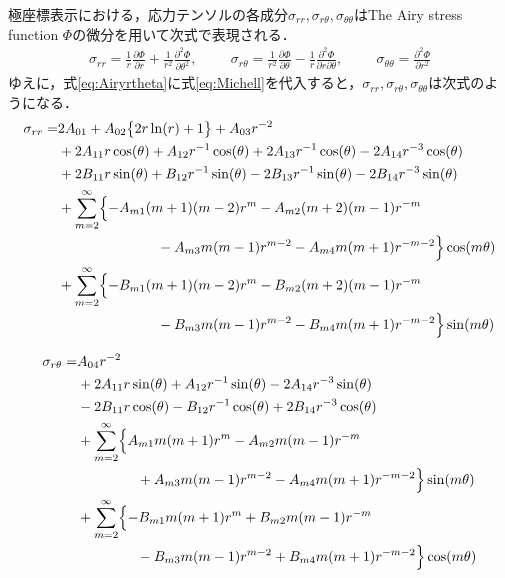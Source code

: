 極座標表示における，応力テンソルの各成分$\sigma_{rr},\sigma_{r\theta},\sigma_{\theta\theta}$はThe Airy stress function $\Phi$の微分を用いて次式で表現される．
\begin{align}
	\sigma_{rr}=\frac{1}{r}\frac{\partial \Phi}{\partial r}
	+\frac{1}{r^2}\frac{\partial^2 \Phi}{\partial \theta^2},\hspace{1cm}
	\sigma_{r\theta}=\frac{1}{r^2}\frac{\partial \Phi}{\partial \theta}
	-\frac{1}{r}\frac{\partial^2 \Phi}{\partial r\partial \theta},\hspace{1cm}
	\sigma_{\theta\theta}=\frac{\partial^2 \Phi}{\partial r^2}
	\label{eq:Airyrtheta}
\end{align}
ゆえに，式\eqref{eq:Airyrtheta}に式\eqref{eq:Michell}を代入すると，$\sigma_{rr},\sigma_{r\theta},\sigma_{\theta\theta}$は次式のようになる．
\begin{align}
	\sigma_{rr} =&2A_{01}
	+A_{02}\bigl\{ 2r\ln(r)+1\bigr\}
	+A_{03}r^{-2}
	\nonumber
	\\
	&+2A_{11}r\cos(\theta)
	+A_{12}r^{-1}\cos(\theta)
	+2A_{13}r^{-1}\cos(\theta)
	-2A_{14}r^{-3}\cos(\theta)
	\nonumber
	\\
	&+2B_{11}r\sin(\theta)
	+B_{12}r^{-1}\sin(\theta)
	-2B_{13}r^{-1}\sin(\theta)
	-2B_{14}r^{-3}\sin(\theta)
	\nonumber
	\\
	&+\sum_{m=2}^{\infty}\Bigl\{-A_{m1}(m+1)(m-2)r^{m}
	-A_{m2}(m+2)(m-1)r^{-m}
	\nonumber
	\\
	&\hspace{2.5cm}
	-A_{m3}m(m-1)r^{m-2}
	-A_{m4}m(m+1)r^{-m-2}\Bigr\}\cos(m\theta)
	\nonumber
	\\
	&+\sum_{m=2}^{\infty}\Bigl\{-B_{m1}(m+1)(m-2)r^{m}
	-B_{m2}(m+2)(m-1)r^{-m}
	\nonumber
	\\
	&\hspace{2.5cm}
	-B_{m3}m(m-1)r^{m-2}
	-B_{m4}m(m+1)r^{-m-2}\Bigr\}\sin(m\theta)
	\label{eq:SigmaRR}
\end{align}

\begin{align}
	\sigma_{r\theta} =&A_{04}r^{-2}
	\nonumber
	\\
	&+2A_{11}r\sin(\theta)
	+A_{12}r^{-1}\sin(\theta)
	-2A_{14}r^{-3}\sin(\theta)
	\nonumber
	\\
	&-2B_{11}r\cos(\theta)
	-B_{12}r^{-1}\cos(\theta)
	+2B_{14}r^{-3}\cos(\theta)
	\nonumber
	\\
	&+\sum_{m=2}^{\infty}\Bigl\{A_{m1}m(m+1)r^{m}
	-A_{m2}m(m-1)r^{-m}
	\nonumber
	\\
	&\hspace{1.5cm}
	+A_{m3}m(m-1)r^{m-2}
	-A_{m4}m(m+1)r^{-m-2}\Bigr\}\sin(m\theta)
	\nonumber
	\\
	&+\sum_{m=2}^{\infty}\Bigl\{-B_{m1}m(m+1)r^{m}
	+B_{m2}m(m-1)r^{-m}
	\nonumber
	\\
	&\hspace{1.5cm}
	-B_{m3}m(m-1)r^{m-2}
	+B_{m4}m(m+1)r^{-m-2}\Bigr\}\cos(m\theta)
	\label{eq:SigmaRTh}
\end{align}

